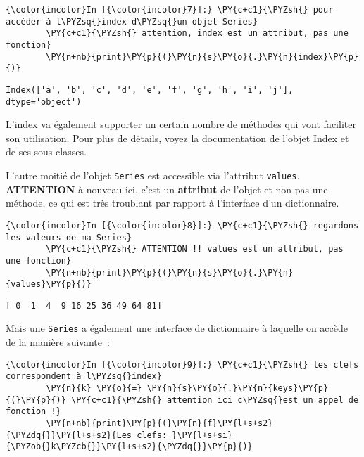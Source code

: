     \begin{Verbatim}[commandchars=\\\{\},frame=single,framerule=0.3mm,rulecolor=\color{cellframecolor}]
{\color{incolor}In [{\color{incolor}7}]:} \PY{c+c1}{\PYZsh{} pour accéder à l\PYZsq{}index d\PYZsq{}un objet Series}
        \PY{c+c1}{\PYZsh{} attention, index est un attribut, pas une fonction}
        \PY{n+nb}{print}\PY{p}{(}\PY{n}{s}\PY{o}{.}\PY{n}{index}\PY{p}{)}
\end{Verbatim}


    \begin{Verbatim}[commandchars=\\\{\},frame=single,framerule=0.3mm,rulecolor=\color{cellframecolor}]
Index(['a', 'b', 'c', 'd', 'e', 'f', 'g', 'h', 'i', 'j'], dtype='object')
\end{Verbatim}

    L'index va également supporter un certain nombre de méthodes qui vont
faciliter son utilisation. Pour plus de détails, voyez
\href{http://pandas.pydata.org/pandas-docs/stable/generated/pandas.Index.html\#pandas.Index}{la
documentation de l'objet Index} et de ses sous-classes.

    L'autre moitié de l'objet \texttt{Series} est accessible via l'attribut
\texttt{values}. \textbf{ATTENTION} à nouveau ici, c'est un
\textbf{attribut} de l'objet et non pas une méthode, ce qui est très
troublant par rapport à l'interface d'un dictionnaire.

    \begin{Verbatim}[commandchars=\\\{\},frame=single,framerule=0.3mm,rulecolor=\color{cellframecolor}]
{\color{incolor}In [{\color{incolor}8}]:} \PY{c+c1}{\PYZsh{} regardons les valeurs de ma Series}
        \PY{c+c1}{\PYZsh{} ATTENTION !! values est un attribut, pas une fonction}
        \PY{n+nb}{print}\PY{p}{(}\PY{n}{s}\PY{o}{.}\PY{n}{values}\PY{p}{)}
\end{Verbatim}


    \begin{Verbatim}[commandchars=\\\{\},frame=single,framerule=0.3mm,rulecolor=\color{cellframecolor}]
[ 0  1  4  9 16 25 36 49 64 81]
\end{Verbatim}

    Mais une \texttt{Series} a également une interface de dictionnaire à
laquelle on accède de la manière suivante~:

    \begin{Verbatim}[commandchars=\\\{\},frame=single,framerule=0.3mm,rulecolor=\color{cellframecolor}]
{\color{incolor}In [{\color{incolor}9}]:} \PY{c+c1}{\PYZsh{} les clefs correspondent à l\PYZsq{}index}
        \PY{n}{k} \PY{o}{=} \PY{n}{s}\PY{o}{.}\PY{n}{keys}\PY{p}{(}\PY{p}{)} \PY{c+c1}{\PYZsh{} attention ici c\PYZsq{}est un appel de fonction !}
        \PY{n+nb}{print}\PY{p}{(}\PY{n}{f}\PY{l+s+s2}{\PYZdq{}}\PY{l+s+s2}{Les clefs: }\PY{l+s+si}{\PYZob{}k\PYZcb{}}\PY{l+s+s2}{\PYZdq{}}\PY{p}{)}
\end{Verbatim}


